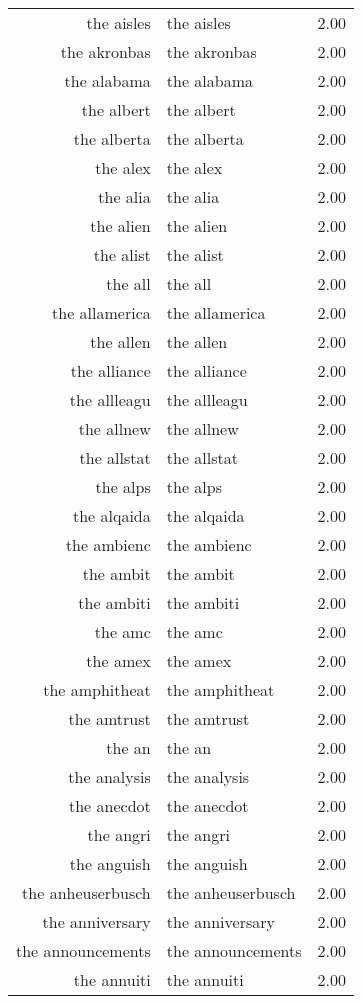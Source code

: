 \begin{table}[ht]
\begin{tabular}{rlr}
  the aisles & the aisles & 2.00 \\ 
  the akronbas & the akronbas & 2.00 \\ 
  the alabama & the alabama & 2.00 \\ 
  the albert & the albert & 2.00 \\ 
  the alberta & the alberta & 2.00 \\ 
  the alex & the alex & 2.00 \\ 
  the alia & the alia & 2.00 \\ 
  the alien & the alien & 2.00 \\ 
  the alist & the alist & 2.00 \\ 
  the all & the all & 2.00 \\ 
  the allamerica & the allamerica & 2.00 \\ 
  the allen & the allen & 2.00 \\ 
  the alliance & the alliance & 2.00 \\ 
  the allleagu & the allleagu & 2.00 \\ 
  the allnew & the allnew & 2.00 \\ 
  the allstat & the allstat & 2.00 \\ 
  the alps & the alps & 2.00 \\ 
  the alqaida & the alqaida & 2.00 \\ 
  the ambienc & the ambienc & 2.00 \\ 
  the ambit & the ambit & 2.00 \\ 
  the ambiti & the ambiti & 2.00 \\ 
  the amc & the amc & 2.00 \\ 
  the amex & the amex & 2.00 \\ 
  the amphitheat & the amphitheat & 2.00 \\ 
  the amtrust & the amtrust & 2.00 \\ 
  the an & the an & 2.00 \\ 
  the analysis & the analysis & 2.00 \\ 
  the anecdot & the anecdot & 2.00 \\ 
  the angri & the angri & 2.00 \\ 
  the anguish & the anguish & 2.00 \\ 
  the anheuserbusch & the anheuserbusch & 2.00 \\ 
  the anniversary & the anniversary & 2.00 \\ 
  the announcements & the announcements & 2.00 \\ 
  the annuiti & the annuiti & 2.00 \\ 

\end{tabular}
\end{table}

